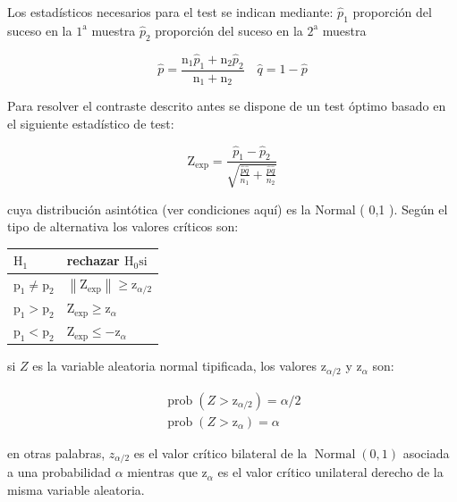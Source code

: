 \documentclass[
]{article}
\begin{document}
Los estadísticos necesarios para el test se indican mediante:
\(\hat{p}_{1}\) proporción del suceso en la \(1^{\mathrm{a}}\) muestra
\(\hat{p}_{2}\) proporción del suceso en la \(2^{\mathrm{a}}\) muestra

\[
\hat{p}=\frac{\mathrm{n}_{1} \hat{p}_{1}+\mathrm{n}_{2} \hat{p}_{2}}{\mathrm{n}_{1}+\mathrm{n}_{2}} \quad \hat{q}=1-\hat{p}
\]

Para resolver el contraste descrito antes se dispone de un test óptimo basado en el siguiente estadístico de test:

\[
\mathrm{Z}_{\exp }=\frac{\hat{p}_{1}-\hat{p}_{2}}{\sqrt{\frac{\hat{p} \hat{q}}{n_{1}}+\frac{\hat{p} \hat{q}}{n_{2}}}}
\]

cuya distribución asintótica (ver condiciones aquí) es la Normal ( 0,1 ). Según el tipo de alternativa los valores críticos son:

\begin{longtable}[]{@{}
  >{\centering\arraybackslash}p{}
  >{\centering\arraybackslash}p{}@{}}
\toprule\noalign{}
\begin{minipage}[b]{\linewidth}\centering
\(\mathrm{H}_{1}\)
\end{minipage} & \begin{minipage}[b]{\linewidth}\centering
rechazar \(\mathrm{H}_{0} \mathrm{si}\)
\end{minipage} \\
\midrule\noalign{}
\endhead
\bottomrule\noalign{}
\endlastfoot
\(\mathrm{p}_{1} \neq \mathrm{p}_{2}\) & \(\left\|\mathrm{Z}_{\exp }\right\| \geq \mathrm{z}_{\alpha / 2}\) \\
\(\mathrm{p}_{1}>\mathrm{p}_{2}\) & \(\mathrm{Z}_{\exp } \geq \mathrm{z}_{\alpha}\) \\
\(\mathrm{p}_{1}<\mathrm{p}_{2}\) & \(\mathrm{Z}_{\exp } \leq-\mathrm{z}_{\alpha}\) \\
\end{longtable}

si \(Z\) es la variable aleatoria normal tipificada, los valores \(\mathrm{z}_{\alpha / 2}\) y \(\mathrm{z}_{\alpha}\) son:

\[
\begin{gathered}
\operatorname{prob}\left(Z>\mathrm{z}_{\alpha / 2}\right)=\alpha / 2 \\
\operatorname{prob}\left(Z>\mathrm{z}_{\alpha}\right)=\alpha
\end{gathered}
\]

en otras palabras, \(z_{\alpha / 2}\) es el valor crítico bilateral de la \(\operatorname{Normal}(0,1)\) asociada a una probabilidad \(\alpha\) mientras que \(\mathrm{z}_{\alpha}\) es el valor crítico unilateral derecho de la misma variable aleatoria.
\end{document}
